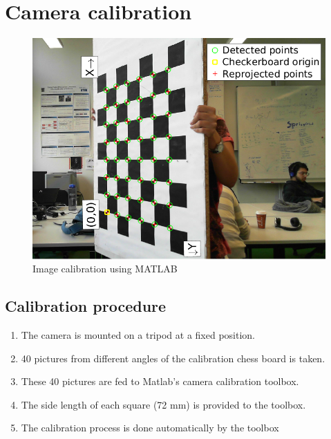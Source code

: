 \documentclass[paper=a4, fontsize=11pt]{scrartcl} %
\title{\hmwkClass \\
       \hmwkTitle}
\author{\hmwkAuthorFullName}
\date{\hmwkDueDate}
\begin{document}
    \maketitle
    \thispagestyle{fancy} %

    \section{Camera calibration}

    \begin{figure}[h!]
        \centering
        \includegraphics[width=0.9\linewidth]{images/cameraCalib_sample.png}
        \caption{Image calibration using MATLAB}
        \label{fig:img1}
    \end{figure}

    \subsection{Calibration procedure}
    \begin{enumerate}
        \item The camera is mounted on a tripod at a fixed position.
        \item 40 pictures from different angles of the calibration chess board is taken.
        \item These 40 pictures are fed to Matlab's camera calibration toolbox.
        \item The side length of each square (72 mm) is provided to the toolbox.
        \item The calibration process is done automatically by the toolbox
    \end{enumerate}
    
\end{document}
